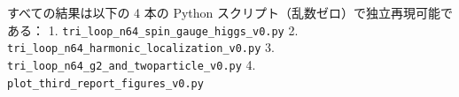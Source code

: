 \documentclass[
  a4paper,
]{ltjsarticle}
\begin{document}
すべての結果は以下の 4 本の Python
スクリプト（乱数ゼロ）で独立再現可能である： 1.
\texttt{tri\_\allowbreak{}loop\_\allowbreak{}n64\_\allowbreak{}spin\_\allowbreak{}gauge\_\allowbreak{}higgs\_\allowbreak{}v0.py} 2.
\texttt{tri\_\allowbreak{}loop\_\allowbreak{}n64\_\allowbreak{}harmonic\_\allowbreak{}localization\_\allowbreak{}v0.py} 3.
\texttt{tri\_\allowbreak{}loop\_\allowbreak{}n64\_\allowbreak{}g2\_\allowbreak{}and\_\allowbreak{}twoparticle\_\allowbreak{}v0.py} 4.
\texttt{plot\_\allowbreak{}third\_\allowbreak{}report\_\allowbreak{}figures\_\allowbreak{}v0.py}
\end{document}
